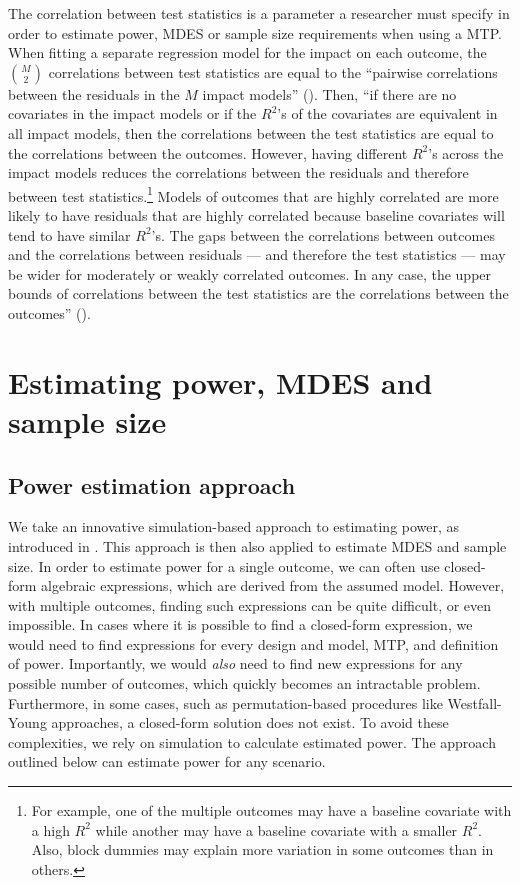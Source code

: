\documentclass[
]{jss}
\begin{document}
The correlation between test statistics is a parameter a researcher must
specify in order to estimate power, MDES or sample size requirements
when using a MTP. When fitting a separate regression model for the
impact on each outcome, the \(\binom{M}{2}\) correlations between test
statistics are equal to the ``pairwise correlations between the
residuals in the \(M\) impact models'' (\citet{Porter2018}). Then, ``if
there are no covariates in the impact models or if the \(R^2\)'s of the
covariates are equivalent in all impact models, then the correlations
between the test statistics are equal to the correlations between the
outcomes. However, having different \(R^2\)'s across the impact models
reduces the correlations between the residuals and therefore between
test statistics.\footnote{For example, one of the multiple outcomes may
  have a baseline covariate with a high \(R^2\) while another may have a
  baseline covariate with a smaller \(R^2\). Also, block dummies may
  explain more variation in some outcomes than in others.} Models of
outcomes that are highly correlated are more likely to have residuals
that are highly correlated because baseline covariates will tend to have
similar \(R^2\)'s. The gaps between the correlations between outcomes
and the correlations between residuals --- and therefore the test
statistics --- may be wider for moderately or weakly correlated
outcomes. In any case, the upper bounds of correlations between the test
statistics are the correlations between the outcomes''
(\citet{Porter2018}).

\section{Estimating power, MDES and sample size}
\label{sec:est}

\subsection{Power estimation approach}
\label{sec:est_power}

We take an innovative simulation-based approach to estimating power, as
introduced in \citet{Porter2018}. This approach is then also applied to
estimate MDES and sample size. In order to estimate power for a single
outcome, we can often use closed-form algebraic expressions, which are
derived from the assumed model. However, with multiple outcomes, finding
such expressions can be quite difficult, or even impossible. In cases
where it is possible to find a closed-form expression, we would need to
find expressions for every design and model, MTP, and definition of
power. Importantly, we would \emph{also} need to find new expressions
for any possible number of outcomes, which quickly becomes an
intractable problem. Furthermore, in some cases, such as
permutation-based procedures like Westfall-Young approaches, a
closed-form solution does not exist. To avoid these complexities, we
rely on simulation to calculate estimated power. The approach outlined
below can estimate power for any scenario.
\end{document}

